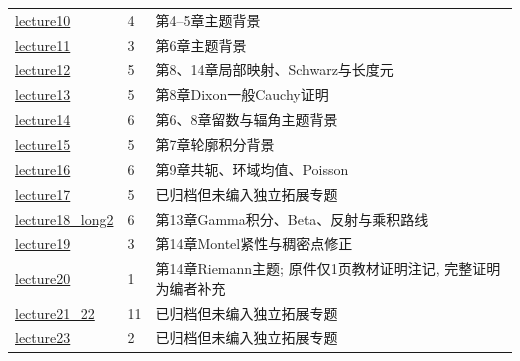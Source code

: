 \begin{longtable}{p{}p{}p{}}
\href{https://ocw.mit.edu/courses/18-112-functions-of-a-complex-variable-fall-2008/resources/lecture10/}{lecture10} & 4 & 第4--5章主题背景\\
\href{https://ocw.mit.edu/courses/18-112-functions-of-a-complex-variable-fall-2008/resources/lecture11/}{lecture11} & 3 & 第6章主题背景\\
\href{https://ocw.mit.edu/courses/18-112-functions-of-a-complex-variable-fall-2008/resources/lecture12/}{lecture12} & 5 & 第8、14章局部映射、Schwarz与长度元\\
\href{https://ocw.mit.edu/courses/18-112-functions-of-a-complex-variable-fall-2008/resources/lecture13/}{lecture13} & 5 & 第8章Dixon一般Cauchy证明\\
\href{https://ocw.mit.edu/courses/18-112-functions-of-a-complex-variable-fall-2008/resources/lecture14/}{lecture14} & 6 & 第6、8章留数与辐角主题背景\\
\href{https://ocw.mit.edu/courses/18-112-functions-of-a-complex-variable-fall-2008/resources/lecture15/}{lecture15} & 5 & 第7章轮廓积分背景\\
\href{https://ocw.mit.edu/courses/18-112-functions-of-a-complex-variable-fall-2008/resources/lecture16/}{lecture16} & 6 & 第9章共轭、环域均值、Poisson\\
\href{https://ocw.mit.edu/courses/18-112-functions-of-a-complex-variable-fall-2008/resources/lecture17/}{lecture17} & 5 & 已归档但未编入独立拓展专题\\
\href{https://ocw.mit.edu/courses/18-112-functions-of-a-complex-variable-fall-2008/resources/lecture18_long2/}{lecture18\_long2} & 6 & 第13章Gamma积分、Beta、反射与乘积路线\\
\href{https://ocw.mit.edu/courses/18-112-functions-of-a-complex-variable-fall-2008/resources/lecture19/}{lecture19} & 3 & 第14章Montel紧性与稠密点修正\\
\href{https://ocw.mit.edu/courses/18-112-functions-of-a-complex-variable-fall-2008/resources/lecture20/}{lecture20} & 1 & 第14章Riemann主题; 原件仅1页教材证明注记, 完整证明为编者补充\\
\href{https://ocw.mit.edu/courses/18-112-functions-of-a-complex-variable-fall-2008/resources/lecture21_22/}{lecture21\_22} & 11 & 已归档但未编入独立拓展专题\\
\href{https://ocw.mit.edu/courses/18-112-functions-of-a-complex-variable-fall-2008/resources/lecture23/}{lecture23} & 2 & 已归档但未编入独立拓展专题\\
\bottomrule\end{longtable}
